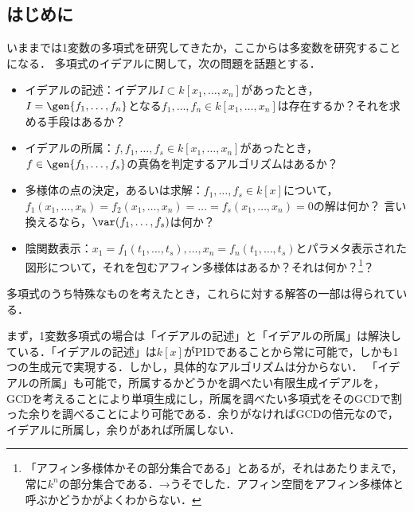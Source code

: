 \subsection{はじめに}
いままでは1変数の多項式を研究してきたか，ここからは多変数を研究することになる．
多項式のイデアルに関して，次の問題を話題とする．
\begin{itemize}
 \item イデアルの記述：イデアル$I\subset k[x_1,\dots,x_n]$があったとき，
$I=\gen{f_1,\dots,f_n}$となる$f_1,\dots,f_n \in k[x_1,\dots,x_n]$は存在するか？それを求める手段はあるか？
 \item イデアルの所属：$f,f_1,\dots,f_s \in k[x_1,\dots,x_n]$があったとき，$f\in \gen{f_1,\dots,f_s}$の真偽を判定するアルゴリズムはあるか？
 \item 多様体の点の決定，あるいは求解：$f_1,\dots,f_s \in k[x]$について，
$f_1(x_1,\dots,x_n)=f_2(x_1,\dots,x_n)=\dots =f_s(x_1,\dots,x_n)=0$の解は何か？
言い換えるなら，$\var(f_1,\dots,f_s)$は何か？
 \item 陰関数表示：$x_1 = f_1(t_1,\dots,t_s),\dots,x_n=f_n(t_1,\dots,t_s)$とパラメタ表示された図形について，それを包むアフィン多様体はあるか？それは何か？\footnote{「アフィン多様体かその部分集合である」とあるが，それはあたりまえで，常に$k^n$の部分集合である．→うそでした．アフィン空間をアフィン多様体と呼ぶかどうかがよくわからない．}？
\end{itemize}

多項式のうち特殊なものを考えたとき，これらに対する解答の一部は得られている．

まず，1変数多項式の場合は「イデアルの記述」と「イデアルの所属」は解決している．「イデアルの記述」は$k[x]$がPIDであることから常に可能で，しかも1つの生成元で実現する．しかし，具体的なアルゴリズムは分からない．
「イデアルの所属」も可能で，所属するかどうかを調べたい有限生成イデアルを，GCDを考えることにより単項生成にし，所属を調べたい多項式をそのGCDで割った余りを調べることにより可能である．余りがなければGCDの倍元なので，イデアルに所属し，余りがあれば所属しない．

